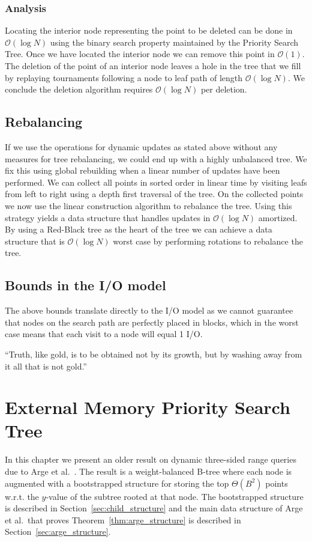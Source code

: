 \documentclass[twoside,11pt,openright]{report}
\begin{document}
\subsection*{Analysis}
Locating the interior node representing the point to be deleted can be done in $\mathcal{O}(\log N)$ using the binary search property maintained by the Priority Search Tree. Once we have located the interior node we can remove this point in $\mathcal{O}(1)$. The deletion of the point of an interior node leaves a hole in the tree that we fill by replaying tournaments following a node to leaf path of length $\mathcal{O}(\log N)$. We conclude the deletion algorithm requires $\mathcal{O}(\log N)$ per deletion.


\section{Rebalancing}
If we use the operations for dynamic updates as stated above without any measures for tree rebalancing, we could end up with a highly unbalanced tree. We fix this using global rebuilding when a linear number of updates have been performed. We can collect all points in sorted order in linear time by visiting leafs from left to right using a depth first traversal of the tree. On the collected points we now use the linear construction algorithm to rebalance the tree. Using this strategy yields a data structure that handles updates in $\mathcal{O}(\log N)$ amortized. By using a Red-Black tree as the heart of the tree we can achieve a data structure that is $\mathcal{O}(\log N)$ worst case by performing rotations to rebalance the tree.

\section{Bounds in the I/O model}
The above bounds translate directly to the I/O model as we cannot guarantee that nodes on the search path are perfectly placed in blocks, which in the worst case means that each visit to a node will equal 1 I/O.

\begin{savequote}[0.5\textwidth]
``Truth, like gold, is to be obtained not by its growth, but by washing away from it all that is not gold.''
\end{savequote}
\chapter{External Memory Priority Search Tree}
\label{chp:arge_pst}
In this chapter we present an older result on dynamic three-sided range queries due to Arge et al.~\cite{arge_samoladas_vitter_1999}.
The result is a weight-balanced B-tree where each node is augmented with a bootstrapped structure for storing the top $\Theta(B^2)$ points w.r.t. the $y$-value of the subtree rooted at that node. The bootstrapped structure is described in Section~\ref{sec:child_structure} and the main data structure of Arge et al.~that proves Theorem~\ref{thm:arge_structure} is described in Section~\ref{sec:arge_structure}.
\end{document}
